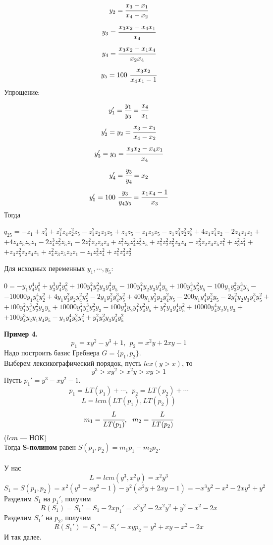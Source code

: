 \documentclass[12pt]{article}
\theoremstyle{definition}
\numberwithin{equation}{section}
\begin{document}
	$$y_2=\cfrac{x_3-x_1}{x_4-x_2}$$
	$$y_3=\cfrac{x_3x_2-x_4x_1}{x_4}$$
	$$y_4=\cfrac{x_3x_2-x_1x_4}{x_2x_4}$$
	$$y_5=100~\cfrac{x_3x_2}{x_4x_1-1}$$
	Упрощение:
	$$y_1'=\cfrac{y_1}{y_3}=\cfrac{x_4}{x_1}$$
	$$y_2'=y_2=\cfrac{x_3-x_1}{x_4-x_2}$$
	$$y_3'=y_3=\cfrac{x_3x_2-x_4x_1}{x_4}$$
	$$y_4'=\cfrac{y_3}{y_4}=x_2$$
	$$y_5'=100~\cfrac{y_3}{y_4y_5}=\cfrac{x_1x_4-1}{x_3}$$
	Тогда 
	\begin{center}
		$q_{25}=-z_1+z_4^2+z_1^2z_4z_2^2z_5-z_1^2z_2z_3z_5+z_4z_5-z_1z_3z_5-z_1z_4^2z_2^2z_5^2+4z_1z_4^2z_2-2z_4z_1z_3+$\\
		$+4z_4z_5z_2z_1-2z_4^3z_2^2z_5z_1-2z_1^2z_2z_3z_4+z_1^2z_3z_4^2z_2^2z_5+z_1^2z_2^2z_5^2z_3z_4-z_3^2z_2z_4z_5z_1^2+z_3^2z_1^2+$\\
		$+z_3z_5^2z_2z_4z_1+z_4^2z_3z_5z_2z_1-z_1z_2^2z_4^2+z_1^2z_4^2z_2^2$
	\end{center}
	Для исходных переменных $y_1, \cdots, y_5$:
	\begin{center}
		$0=-y_1y_4^4y_5^2+y_3^3y_4^2y_5^2+100y_1^2y_2^2y_3y_4^2y_5-100y_1^2y_2y_3y_4^3y_5+100y_4^3y_3^2y_5-100y_1y_3^2y_4^3y_5-$\\
		$-10000y_1y_4^4y_2^2+4y_1y_3^2y_2y_4^2y_5^2-2y_1y_3^2y_4^3y_5^2+400y_1y_3^2y_2y_4^2y_5-200y_1y_4^4y_2^2y_5-2y_1^2y_2y_3y_4^3y_5^2+$\\
		$+100y_1^2y_4^3y_2^2y_3y_5+10000y_1^2y_4^3y_2^2y_3-100y_4^3y_2y_1^2y_4^2y_5+y_1^2y_3y_4^4y_5^2+10000y_4^4y_2y_1y_3+$\\
		$+100y_4^3y_2y_1y_4y_5-y_1y_4^4y_2^2y_5^2+y_1^2y_2^2y_3y_4^2y_5^2$
	\end{center}
	\textbf{Пример 4.}\\
	$$p_1=xy^2-y^3+1,~~p_2=x^2y+2xy-1$$
	Надо построить базис Гребнера $G=\{p_1, p_2\}$.\\
	Выберем лексикографический порядок, пусть $lex(y>x)$, то
	$$y^3>xy^2>x^2y>xy>1$$
	Пусть $p_1'=y^3-xy^2-1$.\\
	$$p_1=LT(p_1)+\cdots,~~p_2=LT(p_2)+\cdots$$
	$$L=lcm(LT(p_1), LT(p_2))$$
	$$m_1=\cfrac{L}{LT(p_1)},~~m_2=\cfrac{L}{LT(p_2)}$$
	($lcm$ --- НОК)\\
	Тогда \textbf{S-полином} равен $S(p_1, p_2)=m_1p_1-m_2p_2$.\\
	\\
	У нас $$L=lcm(y^3, x^2y)=x^2y^3$$
	$$S_1=S(p_1, p_2)=x^2(y^3-xy^2-1)-y^2(x^2y+2xy-1)=-x^3y^2-x^2-2xy^3+y^2$$
	Разделим $S_1$ на $p_1'$, получим $$R(S_1)=S_1'=S_1-2xp_1'=x^3y^2-2x^2y^2+y^2-x^2-2x$$
	Разделим $S_1'$ на $p_2$, получим
	$$R(S_1')=S_1''=S_1'-xyp_2=y^2+xy-x^2-2x$$
	И так далее.\\
\end{document}
